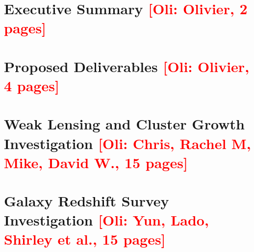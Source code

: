 \documentclass[letter]{ar-1col_WFIRST-HLS}
\newcommand{\Oli}[1]{\textcolor{red}{[{\bf Oli}: #1]}}
\begin{document}
\maketitle

\tableofcontents
\thispagestyle{empty}

\newpage
{}

\section{Executive Summary \Oli{Olivier, 2 pages}}
\label{sec:executive_summary}



\section{Proposed Deliverables \Oli{Olivier, 4 pages}}
\label{sec:deliverables}


%

\section{Weak Lensing and Cluster Growth Investigation \Oli{Chris,
    Rachel M, Mike, David W., 15 pages}}
\label{sec:wl_gal-clusters}


\section{Galaxy Redshift Survey Investigation \Oli{Yun, Lado, Shirley et al., 15 pages}}
\label{sec:gc}

\end{document}
